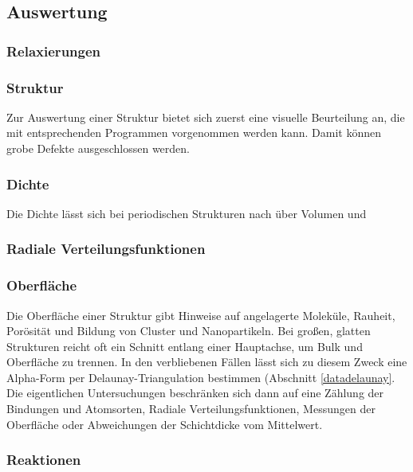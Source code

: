 \subsection{Auswertung}

\subsubsection{Relaxierungen}

\subsubsection{Struktur}

Zur Auswertung einer Struktur bietet sich zuerst eine visuelle Beurteilung an, die mit entsprechenden Programmen vorgenommen werden kann.
Damit können grobe Defekte ausgeschlossen werden.

\subsubsection{Dichte}

Die Dichte lässt sich bei periodischen Strukturen nach über Volumen und

\subsubsection{Radiale Verteilungsfunktionen}

\subsubsection{Oberfläche}

Die Oberfläche einer Struktur gibt Hinweise auf angelagerte Moleküle, Rauheit, Porösität und Bildung von Cluster und Nanopartikeln.
Bei großen, glatten Strukturen reicht oft ein Schnitt entlang einer Hauptachse, um Bulk und Oberfläche zu trennen.
In den verbliebenen Fällen lässt sich zu diesem Zweck eine Alpha-Form per Delaunay-Triangulation bestimmen (Abschnitt \ref{datadelaunay}.
Die eigentlichen Untersuchungen beschränken sich dann auf eine Zählung der Bindungen und Atomsorten, Radiale Verteilungsfunktionen, Messungen der Oberfläche oder Abweichungen der Schichtdicke vom Mittelwert.

\subsubsection{Reaktionen}




